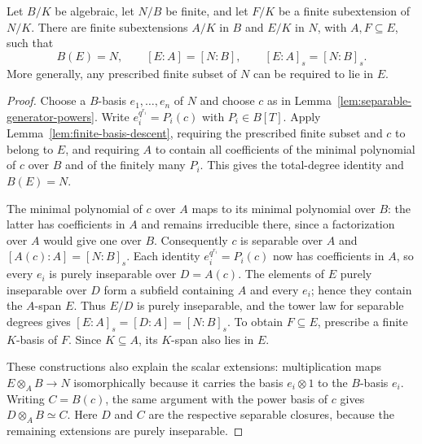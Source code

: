 \begin{lemma}\label{lem:finite-descent-separable}
\leanok
{}
Let $B/K$ be algebraic, let $N/B$ be finite, and let $F/K$ be a
finite subextension of $N/K$. There are finite subextensions
$A/K$ in $B$ and $E/K$ in $N$, with $A,F\subseteq E$, such that
\[
 B(E)=N,\qquad [E:A]=[N:B],\qquad [E:A]_s=[N:B]_s.
\]
More generally, any prescribed finite subset of $N$ can be required
to lie in $E$.
\end{lemma}
\begin{proof}
Choose a $B$-basis $e_1,\ldots,e_n$ of $N$ and choose $c$ as in
Lemma~\ref{lem:separable-generator-powers}. Write
$e_i^{q^{r_i}}=P_i(c)$ with $P_i\in B[T]$.
Apply Lemma~\ref{lem:finite-basis-descent}, requiring the prescribed
finite subset and $c$ to belong to $E$, and requiring $A$ to contain
all coefficients of the minimal polynomial of $c$ over $B$ and of
the finitely many $P_i$. This gives the total-degree identity and
$B(E)=N$.

The minimal polynomial of $c$ over $A$ maps to its minimal polynomial
over $B$: the latter has coefficients in $A$ and remains irreducible
there, since a factorization over $A$ would give one over $B$.
Consequently $c$ is separable over $A$ and
$[A(c):A]=[N:B]_s$. Each identity $e_i^{q^{r_i}}=P_i(c)$ now has
coefficients in $A$, so every $e_i$ is purely inseparable over
$D=A(c)$. The elements of $E$ purely inseparable over $D$ form a
subfield containing $A$ and every $e_i$; hence they contain the
$A$-span $E$. Thus $E/D$ is purely inseparable, and the tower law
for separable degrees gives $[E:A]_s=[D:A]=[N:B]_s$.
To obtain $F\subseteq E$, prescribe a finite $K$-basis of $F$.
Since $K\subseteq A$, its $K$-span also lies in $E$.

These constructions also explain the scalar extensions: multiplication
maps $E\otimes_A B\to N$ isomorphically because it carries the
basis $e_i\otimes1$ to the $B$-basis $e_i$. Writing $C=B(c)$, the
same argument with the power basis of $c$ gives
$D\otimes_A B\simeq C$. Here $D$ and $C$ are the respective
separable closures, because the remaining extensions are purely
inseparable.
\end{proof}


